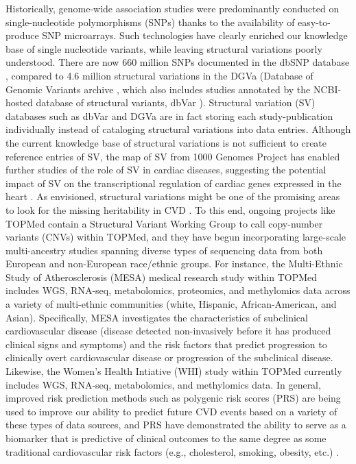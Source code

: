 \documentclass[letter]{bioinfo}
\begin{document}
	Historically, genome-wide association studies were predominantly conducted on single-nucleotide polymorphisms (SNPs) thanks to the availability of easy-to-produce SNP microarrays. Such technologies have clearly enriched our knowledge base of single nucleotide variants, while leaving structural variations poorly understood. There are now 660 million SNPs documented in the dbSNP database \citep{NCBI:2018:dbSNP}, compared to 4.6 million structural variations in the DGVa (Database of Genomic Variants archive \citep{EMBL-EBI:2018:Database}, which also includes studies annotated by the NCBI-hosted database of structural variants, dbVar \citep{NCBI:2018:dbVar}).  Structural variation (SV) databases such as dbVar and DGVa are in fact storing each study-publication individually instead of cataloging structural variations into data entries. Although the current knowledge base of structural variations is not sufficient to create reference entries of SV, the map of SV from 1000 Genomes Project \citep{Sudmant:2015:integrated} has enabled further studies of the role of SV in cardiac diseases, suggesting the potential impact of SV on the transcriptional regulation of cardiac genes expressed in the heart \citep{Haas:2018:Genomic}. As envisioned, structural variations might be one of the promising areas to look for the missing heritability in CVD \citep{Eichler:2010:Missing}.  To this end, ongoing projects like TOPMed contain a Structural Variant Working Group to call copy-number variants (CNVs) within TOPMed, and they have begun incorporating large-scale multi-ancestry studies spanning diverse types of sequencing data from both European and non-European race/ethnic groups.  For instance, the Multi-Ethnic Study of Atherosclerosis (MESA) medical research study \citep{Bild:2002:MultiEthnic} within TOPMed includes WGS, RNA-seq, metabolomics, proteomics, and methylomics data across a variety of multi-ethnic communities (white, Hispanic, African-American, and Asian).  Specifically, MESA investigates the characteristics of subclinical cardiovascular disease (disease detected non-invasively before it has produced clinical signs and symptoms) and the risk factors that predict progression to clinically overt cardiovascular disease or progression of the subclinical disease.  Likewise, the Women's Health Intiative (WHI) study \citep{NHLBI:1991:Women} within TOPMed currently includes WGS, RNA-seq, metabolomics, and methylomics data.  In general, improved risk prediction methods such as polygenic risk scores (PRS) are being used to improve our ability to predict future CVD events \citep{Goldstein:2014:Simple} based on a variety of these types of data sources, and PRS have demonstrated the ability to serve as a biomarker that is predictive of clinical outcomes to the same degree as some traditional cardiovascular risk factors (e.g., cholesterol, smoking, obesity, etc.) \citep{deVries:2015:Incremental}. 
	
\end{document}
